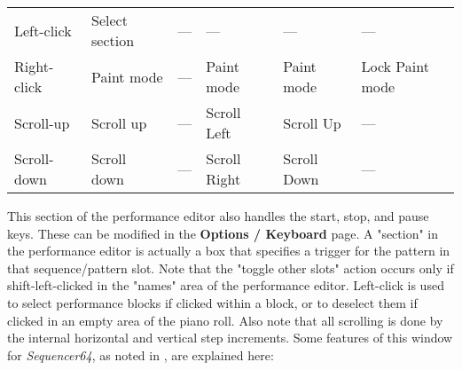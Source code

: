 \begin{table}[H]
\begin{tabular}{l l l l l l}
         Left-click        & Select section  & ---                & ---                & ---             & ---                \\
         Right-click       & Paint mode      & ---                & Paint mode         & Paint mode      & Lock Paint mode    \\
         Scroll-up         & Scroll up       & ---                & Scroll Left        & Scroll Up       & ---                \\
         Scroll-down       & Scroll down     & ---                & Scroll Right       & Scroll Down     & ---                \\
      \end{tabular}
   \end{table}

   This section of the performance editor also handles the start, stop, and
   pause keys.  These can be modified in the \textbf{Options / Keyboard} page.
   A "section" in the performance editor is actually a box that
   specifies a trigger for the pattern in that sequence/pattern slot.
   Note that the "toggle other slots" action occurs only if shift-left-clicked
   in the "names" area of the performance editor.
   Left-click is used to select performance blocks if clicked within
   a block, or to deselect them if clicked in an empty area of the piano roll.
   Also note that all scrolling is done by the internal horizontal and vertical
   step increments.
   Some features of this window for \textsl{Sequencer64},
   as noted in , are explained here:

